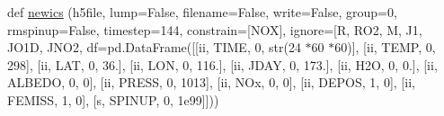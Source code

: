 \begin{DoxyCompactItemize}
def \mbox{\hyperlink{namespacedsmacc_1_1observations_1_1run2ics_acf4b75327ea907f90e391080a9ce7fcc}{newics}} (h5file, lump=False, filename=False, write=False, group=0, rmspinup=False, timestep=144, constrain=\mbox{[}\textquotesingle{}N\+OX\textquotesingle{}\mbox{]}, ignore=\mbox{[}\textquotesingle{}R\textquotesingle{}, R\+O2, M, J1, J\+O1D, J\+N\+O2, df=pd.\+Data\+Frame(\mbox{[}\mbox{[}\textquotesingle{}ii\textquotesingle{}, \textquotesingle{}T\+I\+ME\textquotesingle{}, \textquotesingle{}0\textquotesingle{}, str(24 $\ast$60 $\ast$60)\mbox{]}, \mbox{[}\textquotesingle{}ii\textquotesingle{}, \textquotesingle{}T\+E\+MP\textquotesingle{}, \textquotesingle{}0\textquotesingle{}, \textquotesingle{}298\textquotesingle{}\mbox{]}, \mbox{[}\textquotesingle{}ii\textquotesingle{}, \textquotesingle{}L\+AT\textquotesingle{}, \textquotesingle{}0\textquotesingle{}, \textquotesingle{}36.\textquotesingle{}\mbox{]}, \mbox{[}\textquotesingle{}ii\textquotesingle{}, \textquotesingle{}L\+ON\textquotesingle{}, \textquotesingle{}0\textquotesingle{}, \textquotesingle{}116.\textquotesingle{}\mbox{]}, \mbox{[}\textquotesingle{}ii\textquotesingle{}, \textquotesingle{}J\+D\+AY\textquotesingle{}, \textquotesingle{}0\textquotesingle{}, \textquotesingle{}173.\textquotesingle{}\mbox{]}, \mbox{[}\textquotesingle{}ii\textquotesingle{}, \textquotesingle{}H2O\textquotesingle{}, \textquotesingle{}0\textquotesingle{}, \textquotesingle{}0.\textquotesingle{}\mbox{]}, \mbox{[}\textquotesingle{}ii\textquotesingle{}, \textquotesingle{}A\+L\+B\+E\+DO\textquotesingle{}, \textquotesingle{}0\textquotesingle{}, \textquotesingle{}0\textquotesingle{}\mbox{]}, \mbox{[}\textquotesingle{}ii\textquotesingle{}, \textquotesingle{}P\+R\+E\+SS\textquotesingle{}, \textquotesingle{}0\textquotesingle{}, \textquotesingle{}1013\textquotesingle{}\mbox{]}, \mbox{[}\textquotesingle{}ii\textquotesingle{}, \textquotesingle{}N\+Ox\textquotesingle{}, \textquotesingle{}0\textquotesingle{}, \textquotesingle{}0\textquotesingle{}\mbox{]}, \mbox{[}\textquotesingle{}ii\textquotesingle{}, \textquotesingle{}D\+E\+P\+OS\textquotesingle{}, \textquotesingle{}1\textquotesingle{}, \textquotesingle{}0\textquotesingle{}\mbox{]}, \mbox{[}\textquotesingle{}ii\textquotesingle{}, \textquotesingle{}F\+E\+M\+I\+SS\textquotesingle{}, \textquotesingle{}1\textquotesingle{}, \textquotesingle{}0\textquotesingle{}\mbox{]}, \mbox{[}\textquotesingle{}s\textquotesingle{}, \textquotesingle{}S\+P\+I\+N\+UP\textquotesingle{}, \textquotesingle{}0\textquotesingle{}, \textquotesingle{}1e99\textquotesingle{}\mbox{]}\mbox{]}))
\end{DoxyCompactItemize}


